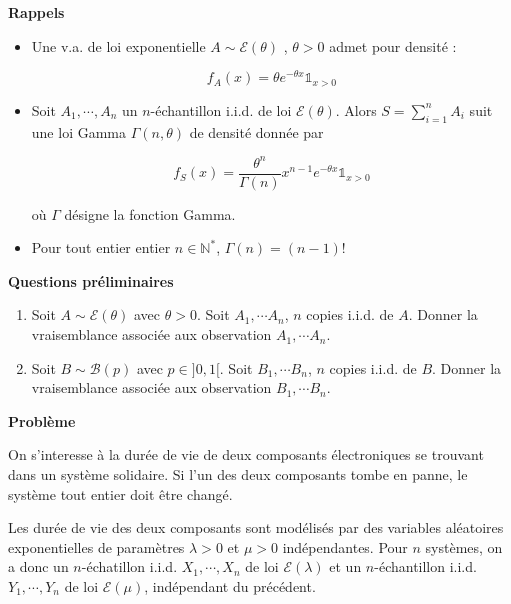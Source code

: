 \smallskip

\begin{mdframed}
\begin{exercice}

\textbf{Rappels}

\smallskip

\begin{itemize}
\item Une v.a.  de loi exponentielle $A \sim \mathcal{E}(\theta)$ , $\theta >0$ admet pour densité :

$$
f_A(x) = \theta e^{-\theta x} \mathbb{1}_{x>0}
$$
\item Soit $A_1,\cdots,A_n$ un $n$-échantillon i.i.d. de loi $\mathcal{E}(\theta)$. Alors $S = \sum_{i=1}^n A_i$ suit une loi Gamma $\Gamma(n,\theta)$ de densité donnée par

$$
f_S(x) = \frac{\theta^n}{\Gamma(n)} x^{n-1} e^{- \theta x} \mathbb{1}_{x>0}
$$

où $\Gamma$ désigne la fonction Gamma. 
\item Pour tout entier entier $n \in \mathbb{N}^*$, $\Gamma(n) = (n-1)!$
\end{itemize}

\smallskip

\textbf{Questions préliminaires}

\smallskip

\begin{enumerate}
\item Soit $A \sim \mathcal{E}(\theta)$ avec $\theta > 0$. Soit $A_1, \cdots A_n$, $n$ copies i.i.d. de $A$. Donner la vraisemblance associée aux observation $A_1, \cdots A_n$.
\item Soit $B \sim \mathcal{B}(p)$ avec $p \in ]0,1[$. Soit $B_1, \cdots B_n$, $n$ copies i.i.d. de $B$. Donner la vraisemblance associée aux observation $B_1, \cdots B_n$.
\end{enumerate}

\smallskip

\textbf{Problème}

\smallskip

On s'interesse à la durée de vie de deux composants électroniques se trouvant dans un système solidaire. Si l'un des deux composants tombe en panne, le système tout entier doit être changé.

Les durée de vie des deux composants sont modélisés par des variables aléatoires exponentielles de paramètres $\lambda > 0$ et $\mu > 0$ indépendantes. Pour $n$ systèmes, on a donc un $n$-échatillon i.i.d. $X_1,\cdots,X_n$ de loi $\mathcal{E}(\lambda)$ et un $n$-échantillon i.i.d. $Y_1, \cdots , Y_n$ de loi $\mathcal{E}(\mu)$, indépendant du précédent.


\end{exercice}
\end{mdframed}
